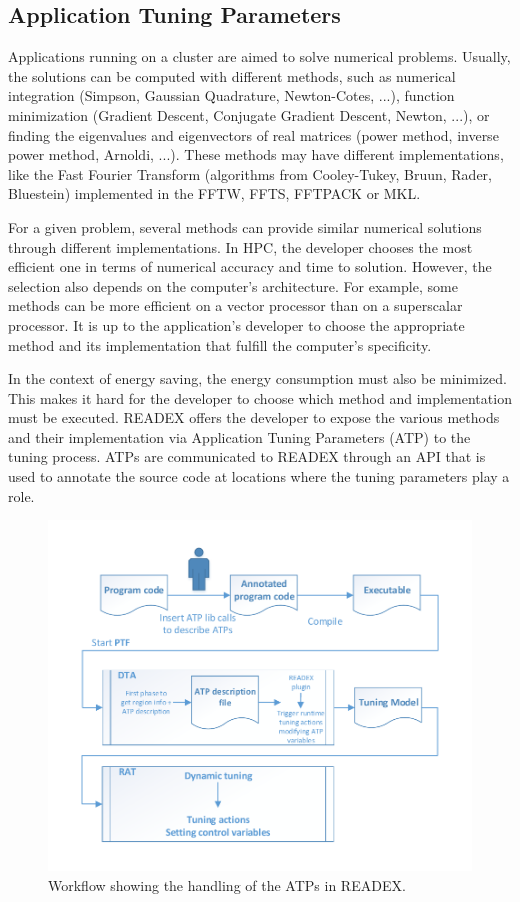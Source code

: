 \subsection{Application Tuning Parameters} \label{sec:atp}

Applications running on a cluster are aimed to solve numerical problems. Usually, the solutions can be computed with different methods, such as numerical integration (Simpson, Gaussian Quadrature, Newton-Cotes, ...), function minimization (Gradient Descent, Conjugate Gradient Descent, Newton, ...), or finding the eigenvalues and eigenvectors of real matrices (power method, inverse power method, Arnoldi, ...). These methods may have different implementations, like the Fast Fourier Transform (algorithms from Cooley-Tukey, Bruun, Rader, Bluestein) implemented in the FFTW, FFTS, FFTPACK or MKL.

For a given problem, several methods can provide similar numerical solutions through different implementations. In HPC, the developer chooses the most efficient one in terms of numerical accuracy and time to solution. However, the selection also depends on the computer's architecture. For example, some methods can be more efficient on a vector processor than on a superscalar processor. It is up to the application's developer to choose the appropriate method and its implementation that fulfill the computer's specificity.

In the context of energy saving, the energy consumption must also be minimized. This makes it hard for the developer to choose which method and implementation must be executed. READEX offers the developer to expose the various methods and their implementation via Application Tuning Parameters (ATP) to the tuning process. ATPs are communicated to READEX through an API that is used to annotate the source code at locations where the tuning parameters play a role.

\begin{figure}
\centering
\includegraphics[width=0.8\columnwidth]{figures/overall_design.pdf} 
\caption{Workflow showing the handling of the ATPs in READEX. }
\label{fig_ATP_workflow}
\end{figure} 

